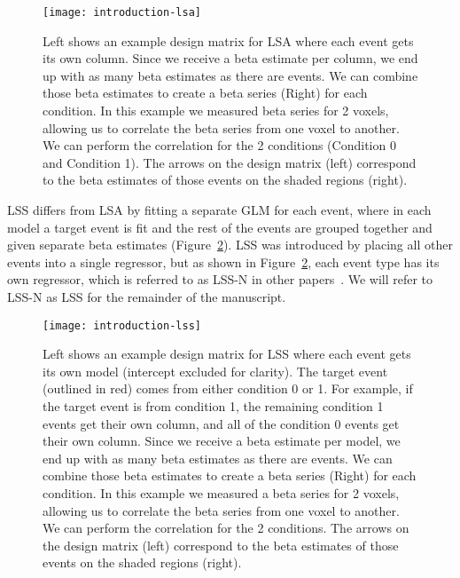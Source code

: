 \documentclass[phd,appendix,figures]{uithesis}
\begin{document}
\begin{figure}[H]
  \centering
  \texttt{[image: introduction-lsa]}
  \caption[Example LSA design matrix and analysis]{
    Left shows an example design matrix for LSA where each event gets its own column.
    Since we receive a beta estimate per column, we end up with as many beta estimates as there
    are events.
    We can combine those beta estimates to create a beta series (Right) for each condition.
    In this example we measured beta series for 2 voxels, allowing us to
    correlate the beta series from one voxel to another.
    We can perform the correlation for the 2 conditions (Condition 0 and Condition 1).
    The arrows on the design matrix (left) correspond to the beta estimates of those events
    on the shaded regions (right).
  }
  \label{fig:introlsa}
\end{figure}

LSS differs from LSA by fitting a separate GLM for each event, where in each model a target
event is fit and the rest of the events are grouped together and given separate beta estimates (Figure~\ref{fig:introlss}).
LSS was introduced by placing all other events into a single regressor, but as shown in Figure~\ref{fig:introlss},
each event type has its own regressor, which is referred to as LSS-N in other papers~\cite{Rissman2004,Abdulrahman2016,Mumford2012}.
We will refer to LSS-N as LSS for the remainder of the manuscript.

\begin{figure}[H]
  \centering
  \texttt{[image: introduction-lss]}
  \caption[Example LSS design matrix and analysis]{
    Left shows an example design matrix for LSS where each event gets its own model
    (intercept excluded for clarity).
    The target event (outlined in red) comes from either condition 0 or 1.
    For example, if the target event is from condition 1, the remaining condition 1 events
    get their own column, and all of the condition 0 events get their own column.
    Since we receive a beta estimate per model, we end up with as many beta estimates as there
    are events.
    We can combine those beta estimates to create a beta series (Right) for each condition.
    In this example we measured a beta series for 2 voxels, allowing us to
    correlate the beta series from one voxel to another.
    We can perform the correlation for the 2 conditions.
    The arrows on the design matrix (left) correspond to the beta estimates of those events
    on the shaded regions (right).
  }
  \label{fig:introlss}
\end{figure}
\end{document}
